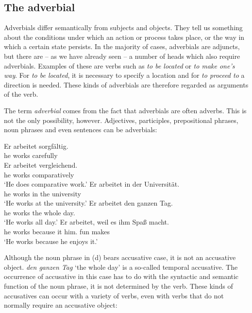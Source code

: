 \subsection{The adverbial}
\label{sec-Adverbiale}

Adverbials differ semantically from subjects and objects. They tell us something
about the conditions under which an action or process takes place, or the way in which a certain
state persists. In the majority of cases, adverbials are adjuncts, but there are -- as we have
already seen -- a number of heads which also require adverbials. Examples of these are verbs such as
\emph{to be located} or \emph{to make one's way}.  For \emph{to be located}, it is necessary to
specify a location and for \emph{to proceed to} a direction is needed. These kinds of adverbials
are therefore regarded as arguments of the verb.

The term \emph{adverbial} comes from the fact that adverbials are often adverbs. This is not the only possibility, however. Adjectives, participles, prepositional phrases, 
noun phrases and even sentences can be adverbials:

\eal
\ex 
\gll Er arbeitet sorgfältig.\\
	 he works carefully\\
\ex 
\gll Er arbeitet vergleichend.\\
	 he works comparatively\\
\glt `He does comparative work.'
\ex 
\gll Er arbeitet in der Universität.\\
	 he works in the university\\
\glt `He works at the university.'
\ex 
\gll Er arbeitet den ganzen Tag.\\
     he works the whole day.\acc\\
\glt `He works all day.'
\ex 
\gll Er arbeitet, weil es ihm Spaß macht.\\
	 he works because it him.\dat{} fun makes\\
\glt `He works because he enjoys it.'
\zl

\noindent
Although the noun phrase in (d) bears accusative case, it is not an accusative object. \emph{den ganzen Tag} `the whole day' is a so-called temporal accusative.
The occurrence of accusative in this case has to do with the syntactic and semantic function of the noun phrase, it is not determined by the verb. These kinds of accusatives
can occur with a variety of verbs, even with verbs that do not normally require an accusative object: 

